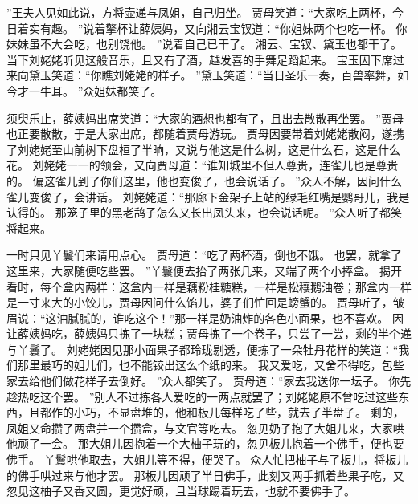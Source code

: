 ”王夫人见如此说，方将壶递与凤姐，自己归坐。
贾母笑道：“大家吃上两杯，今日着实有趣。
”说着擎杯让薛姨妈，又向湘云宝钗道：“你姐妹两个也吃一杯。
你妹妹虽不大会吃，也别饶他。
”说着自己已干了。
湘云、宝钗、黛玉也都干了。
当下刘姥姥听见这般音乐，且又有了酒，越发喜的手舞足蹈起来。
宝玉因下席过来向黛玉笑道：“你瞧刘姥姥的样子。
”黛玉笑道：“当日圣乐一奏，百兽率舞，如今才一牛耳。
”众姐妹都笑了。
\par
须臾乐止，薛姨妈出席笑道：“大家的酒想也都有了，且出去散散再坐罢。
”贾母也正要散散，于是大家出席，都随着贾母游玩。
贾母因要带着刘姥姥散闷，遂携了刘姥姥至山前树下盘桓了半晌，又说与他这是什么树，这是什么石，这是什么花。
刘姥姥一一的领会，又向贾母道：“谁知城里不但人尊贵，连雀儿也是尊贵的。
偏这雀儿到了你们这里，他也变俊了，也会说话了。
”众人不解，因问什么雀儿变俊了，会讲话。
刘姥姥道：“那廊下金架子上站的绿毛红嘴是鹦哥儿，我是认得的。
那笼子里的黑老鸹子怎么又长出凤头来，也会说话呢。
”众人听了都笑将起来。
\par
一时只见丫鬟们来请用点心。
贾母道：“吃了两杯酒，倒也不饿。
也罢，就拿了这里来，大家随便吃些罢。
”丫鬟便去抬了两张几来，又端了两个小捧盒。
揭开看时，每个盒内两样：这盒内一样是藕粉桂糖糕，一样是松穰鹅油卷；那盒内一样是一寸来大的小饺儿，贾母因问什么馅儿，婆子们忙回是螃蟹的。
贾母听了，皱眉说：“这油腻腻的，谁吃这个！”那一样是奶油炸的各色小面果，也不喜欢。
因让薛姨妈吃，薛姨妈只拣了一块糕；贾母拣了一个卷子，只尝了一尝，剩的半个递与丫鬟了。
刘姥姥因见那小面果子都玲珑剔透，便拣了一朵牡丹花样的笑道：“我们那里最巧的姐儿们，也不能铰出这么个纸的来。
我又爱吃，又舍不得吃，包些家去给他们做花样子去倒好。
”众人都笑了。
贾母道：“家去我送你一坛子。
你先趁热吃这个罢。
”别人不过拣各人爱吃的一两点就罢了；刘姥姥原不曾吃过这些东西，且都作的小巧，不显盘堆的，他和板儿每样吃了些，就去了半盘子。
剩的，凤姐又命攒了两盘并一个攒盒，与文官等吃去。
忽见奶子抱了大姐儿来，大家哄他顽了一会。
那大姐儿因抱着一个大柚子玩的，忽见板儿抱着一个佛手，便也要佛手。
丫鬟哄他取去，大姐儿等不得，便哭了。
众人忙把柚子与了板儿，将板儿的佛手哄过来与他才罢。
那板儿因顽了半日佛手，此刻又两手抓着些果子吃，又忽见这柚子又香又圆，更觉好顽，且当球踢着玩去，也就不要佛手了。
\par
